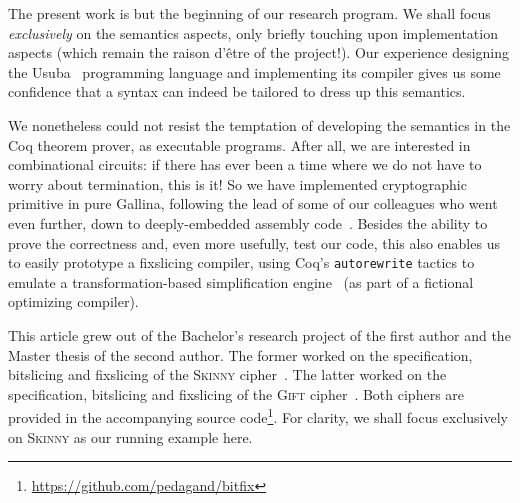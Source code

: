 \documentclass[draft,english]{jflart}
\newcommand{\Skinny}{\textsc{Skinny}}
\newcommand{\Gift}{\textsc{Gift}}
\begin{document}

The present work is but the beginning of our research program. We
shall focus \emph{exclusively} on the semantics aspects, only briefly
touching upon implementation aspects (which remain the raison d'être
of the project!). Our experience designing the Usuba~\citep{mercadier:PhD}
programming language and implementing its compiler gives us some
confidence that a syntax can indeed be tailored to dress up this
semantics.

We nonetheless could not resist the temptation of developing the
semantics in the Coq theorem prover, as executable programs. After
all, we are interested in combinational circuits: if there has ever
been a time where we do not have to worry about termination, this is
it! So we have implemented cryptographic primitive in pure Gallina,
following the lead of some of our colleagues who went even further,
down to deeply-embedded assembly code~\citep{chlipala:coq-crypto}.
Besides the ability to prove the correctness and, even more usefully,
test our code, this also enables us to easily prototype a fixslicing
compiler, using Coq's \texttt{autorewrite} tactics to emulate a
transformation-based simplification
engine~\citep{peyton-jones:haskell-optim} (as part of a fictional
optimizing compiler).




This article grew out of the Bachelor's research project of the first
author and the Master thesis of the second author. The former worked
on the specification, bitslicing and fixslicing of the \Skinny{}
cipher~\citep{beierle:skinny, adomnicai:fixslicing-AES-like}. The
latter worked on the specification, bitslicing and fixslicing of the
\Gift{} cipher~\citep{subhadeep:gift, adominicai:fixslicing-gift}. Both
ciphers are provided in the accompanying source
code\footnote{\url{https://github.com/pedagand/bitfix}}. For clarity,
we shall focus exclusively on \Skinny{} as our running example here.
\end{document}
